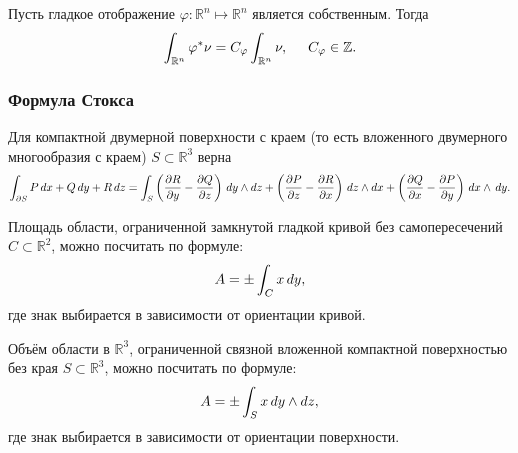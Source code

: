 \begin{to_tas}
    \label{task_6.108}
    Пусть гладкое отображение $\varphi \colon \mathbb{R}^n \mapsto \mathbb{R}^n$ является собственным. Тогда
    \begin{equation*}
        \int_{\mathbb{R}^n}\varphi^* \nu = C_\varphi \int_{\mathbb{R}^n} \nu, \hspace{0.5cm} 
        C_\varphi \in \mathbb{Z}.
    \end{equation*}
\end{to_tas}

\subsubsection*{Формула Стокса}


\begin{to_lem}
     Для компактной двумерной поверхности с краем (то есть вложенного двумерного многообразия с краем) $S \subset \mathbb{R}^3$ верна
\begin{equation*}
    \int_{\partial S} P \, d x + Q \, d y + R \, d z =
    \int_S \left(\frac{\partial R}{\partial y} - \frac{\partial Q}{\partial z} \right) \, d y \wedge d z + 
    \left(\frac{\partial P}{\partial z} - \frac{\partial R}{\partial x} \right) \, d z \wedge dx + 
    \left(\frac{\partial Q}{\partial x} - \frac{\partial P}{\partial y} \right) \, d x \wedge \, d y.
\end{equation*}
\end{to_lem}


\begin{to_tas} 
    Площадь области, ограниченной замкнутой гладкой кривой без самопересечений $C \subset \mathbb{R}^2$, можно посчитать по формуле:
    \begin{equation*}
         A = \pm \int_C x \, d y,
     \end{equation*} 
    где знак выбирается в зависимости от ориентации кривой.
\end{to_tas}

\begin{to_tas} 
    Объём области в $\mathbb{R}^3$, ограниченной связной вложенной компактной поверхностью без края $S \subset \mathbb{R}^3$, можно посчитать по формуле:
    \begin{equation*}
         A = \pm \int_S x \, d y \wedge d z,
     \end{equation*} 
    где знак выбирается в зависимости от ориентации поверхности.
\end{to_tas}

